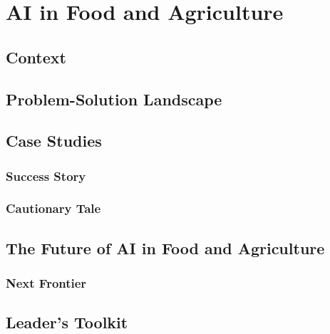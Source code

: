 \chapter{AI in Food and Agriculture}
\label{chap:ai_in_food_and_agriculture}

\section{Context}
\label{sec:food_ag_context}

\section{Problem-Solution Landscape}
\label{sec:food_ag_problem_solution}

\section{Case Studies}
\label{sec:food_ag_case_studies}
\subsection{Success Story}
\label{sec:food_ag_success_story}
\subsection{Cautionary Tale}
\label{sec:food_ag_cautionary_tale}

\section{The Future of AI in Food and Agriculture}
\label{sec:future_of_ai_in_food_ag}
\subsection{Next Frontier}
\label{sec:food_ag_next_frontier}

\section{Leader's Toolkit}
\label{sec:food_ag_leaders_toolkit}